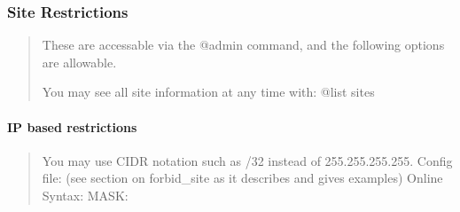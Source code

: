 \documentclass[letterpaper,10pt,english]{sphinxmanual}
\begin{document}
\subsubsection{Site Restrictions}
\label{\detokenize{security:site-restrictions}}\begin{quote}

\sphinxAtStartPar
These are accessable via the @admin command, and the following options are
allowable.

\sphinxAtStartPar
You may see all site information at any time with: @list sites
\end{quote}


\paragraph{IP based restrictions}
\label{\detokenize{security:ip-based-restrictions}}\begin{quote}

\sphinxAtStartPar
You may use CIDR notation such as /32 instead of 255.255.255.255.
Config file:  (see section on forbid\_site as it describes and gives examples)
Online Syntax: MASK:

\begin{sphinxVerbatim}[commandchars=\\\{\}]
                     
                     


                     
                     

    

                    
                    


\end{sphinxVerbatim}
\end{quote}
\end{document}
